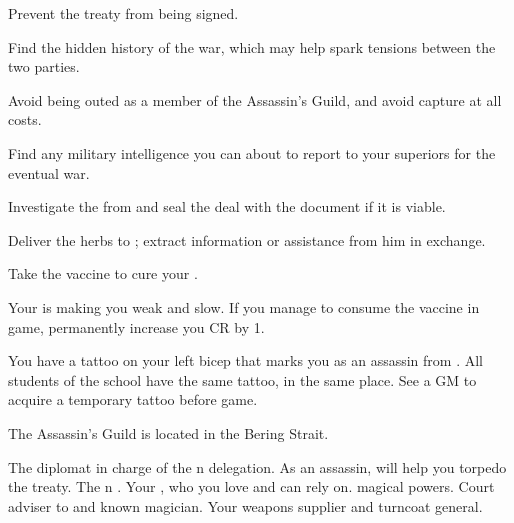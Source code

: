 \documentclass[char]{NeptuneBall}
\begin{document}
\begin{itemz}[Goals]
	\item Prevent the treaty from being signed.
	\item Find the hidden history of the war, which may help spark tensions between the two parties.
	\item Avoid being outed as a member of the Assassin's Guild, and avoid capture at all costs.
  \item Find any military intelligence you can about \pAtlantis{} to report to your superiors for the eventual war.
	\item Investigate the \iPrototype{} from \cGeneral{} and seal the deal with the \iBattlePlan{} document if it is viable.
	\item Deliver the herbs to \cManta{}; extract information or assistance from him in exchange.
	\item Take the vaccine to cure your \pPolio{}.
\end{itemz}

\begin{itemz}[Notes]
  \item Your \pPolio{} is making you weak and slow. If you manage to consume the vaccine in game, permanently increase you CR by 1.
	\item You have a tattoo on your left bicep that marks you as an assassin from \pAssassin{}. All students of the school have the same tattoo, in the same place. See a GM to acquire a temporary tattoo before game.
\end{itemz}

\begin{itemz}[Trivia]
  \item The Assassin's Guild is located in the Bering Strait.
\end{itemz}

\begin{contacts}
	\contact{\cDiplomat{}} The diplomat in charge of the \pPacifica{}n delegation. As an assassin, \cDiplomat{\they} will help you torpedo the treaty.
	\contact{\cPrince{}} The \pPacifica{}n \cPrince{\Prince}.
  \contact{\cBodyguard{}} Your \cSpy{\sibling}, who you love and can rely on. \cBodyguard{\They} \cBodyguard{\have} magical powers.
	\contact{\cManta{}} Court adviser to \cKing{\King} \cKing{} and known magician.
	\contact{\cGeneral{}} Your weapons supplier and turncoat general.
\end{contacts}
\end{document}
